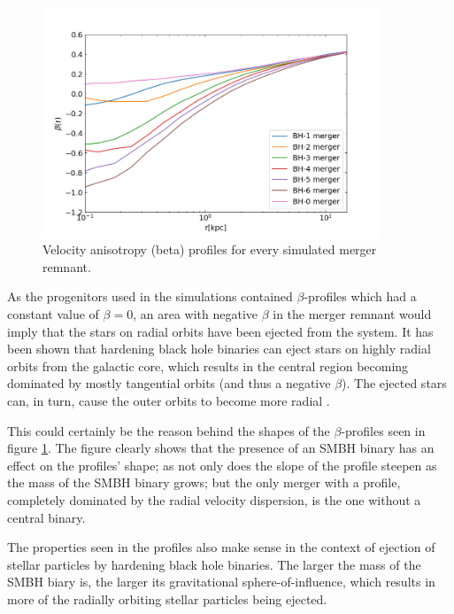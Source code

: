 \documentclass[english, oneside]{HYgradu}
\begin{document}
\begin{figure}[h]
	\centering
	\includegraphics[width=0.9\textwidth]{beta_no_rb.png}
	\caption{Velocity anisotropy (beta) profiles for every simulated merger remnant.}
	\label{figure:beta_no_rb}
\end{figure}

As the progenitors used in the simulations contained $\beta$-profiles which had a constant value of $\beta = 0$, an area with negative $\beta$ in the merger remnant would imply that the stars on radial orbits have been ejected from the system. It has been shown that hardening black hole binaries can eject stars on highly radial orbits from the galactic core, which results in the central region becoming dominated by mostly tangential orbits (and thus a negative $\beta$). The ejected stars can, in turn, cause the outer orbits to become more radial \citep{Quinlan1997, Milosavljevic2001, Thomas2014}. 

This could certainly be the reason behind the shapes of the $\beta$-profiles seen in figure \ref{figure:beta_no_rb}. The figure clearly shows that the presence of an SMBH binary has an effect on the profiles' shape; as not only does the slope of the profile steepen as the mass of the SMBH binary grows; but the only merger with a profile, completely dominated by the radial velocity dispersion, is the one without a central binary. 

The properties seen in the profiles also make sense in the context of ejection of stellar particles by hardening black hole binaries. The larger the mass of the SMBH biary is, the larger its gravitational sphere-of-influence, which results in more of the radially orbiting stellar particles being ejected.
\end{document}
